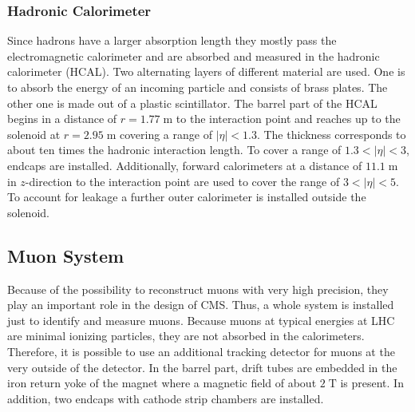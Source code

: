\subsubsection{Hadronic Calorimeter}
	Since hadrons have a larger absorption length they mostly pass the electromagnetic calorimeter and are absorbed and measured in the hadronic calorimeter (HCAL). Two alternating layers of different material are used. One is to absorb the energy of an incoming particle and consists of brass plates. The other one is made out of a plastic scintillator. The barrel part of the HCAL begins in a distance of $r=1.77\;\text{m}$ to the interaction point and reaches up to the solenoid at $r=2.95\;\text{m}$ covering a range of $|\eta| < 1.3$. The thickness corresponds to about ten times the hadronic interaction length. To cover a range of $1.3 < |\eta| < 3$, endcaps are installed. Additionally, forward calorimeters at a distance of $11.1\;\text{m}$ in $z$-direction to the interaction point are used to cover the range of $3 < |\eta| < 5$. To account for leakage a further outer calorimeter is installed outside the solenoid. 

 
\subsection{Muon System}
\label{sec:muonsystem}
	Because of the possibility to reconstruct muons with very high precision, they play an important role in the design of CMS. Thus, a whole system is installed just to identify and measure muons. Because muons at typical energies at LHC are minimal ionizing particles, they are not absorbed in the calorimeters. Therefore, it is possible to use an additional tracking detector for muons at the very outside of the detector. In the barrel part, drift tubes are embedded in the iron return yoke of the magnet where a magnetic field of about $2\;\text{T}$ is present. In addition, two endcaps with cathode strip chambers are installed. 

